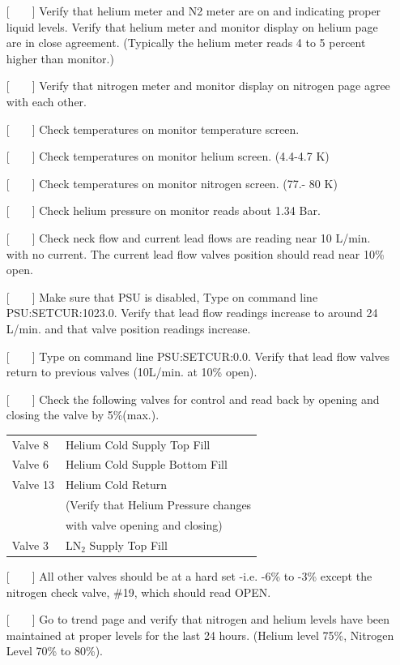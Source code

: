 \begin{itemize}
\item[{[~~~~]}]{Verify that helium meter and N2 meter are on and indicating
proper liquid levels. Verify that helium meter and monitor display on helium
page are in close agreement.  (Typically the helium meter reads 4 to 5 percent
higher than monitor.)}
\item[{[~~~~]}]{Verify that nitrogen meter and monitor display on nitrogen
page agree with each other.}
\item[{[~~~~]}]{Check temperatures on monitor temperature screen.}
\item[{[~~~~]}]{Check temperatures on monitor helium screen. (4.4-4.7 K)}
\item[{[~~~~]}]{Check temperatures on monitor nitrogen screen. (77.- 80 K)}
\item[{[~~~~]}]{Check helium pressure on monitor reads about 1.34 Bar.}
\item[{[~~~~]}]{Check neck flow and current lead flows are reading near 10
L/min. with no current.  The current lead flow valves position should read
near 10\% open.}
\item[{[~~~~]}]{Make sure that PSU is disabled, Type on command line
PSU:SETCUR:1023.0.  Verify that lead flow readings increase to around 24
L/min. and that valve position readings increase.}
\item[{[~~~~]}]{Type on command line PSU:SETCUR:0.0. Verify that lead flow
valves return to previous valves (10L/min. at 10\% open).}
\item[{[~~~~]}]{Check the following valves for control and read back by opening
and closing the valve by 5\%(max.).}

\begin{center}
  \begin{tabular}{ll}
Valve 8	& Helium Cold Supply Top Fill		\\
Valve 6	& Helium Cold Supple Bottom Fill	\\
Valve 13& Helium Cold Return			\\
	& (Verify that Helium Pressure changes  \\
        &  with valve opening and closing)      \\
Valve 3	& LN$_2$ Supply Top Fill		\\
  \end{tabular}
\end{center}
\item[{[~~~~]}]{All other valves should be at a hard set -i.e. -6\% to
-3\% except the nitrogen check valve, \#19, which should read OPEN.}
\item[{[~~~~]}]{Go to trend page and verify that nitrogen and helium levels
have been maintained at proper levels for the last 24
hours.  (Helium level 75\%, Nitrogen Level 70\% to 80\%).}
\end{itemize}


